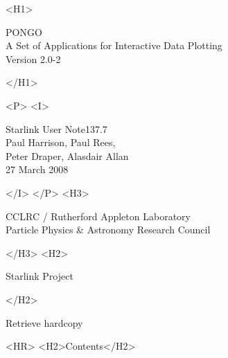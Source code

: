 \documentclass[twoside,11pt]{article}
\newcommand{\stardoccategory}  {Starlink User Note}
\newcommand{\stardocsource}    {sun137.7}
\newcommand{\stardocnumber}    {137.7}
\newcommand{\stardocauthors}   {Paul Harrison, Paul Rees, \\
                                Peter Draper, Alasdair Allan }
\newcommand{\stardocdate}      {27 March 2008}
\newcommand{\stardoctitle}     {PONGO\\[\latex{2ex}]
   A Set of Applications for Interactive Data Plotting \\[\latex{2ex}]
   Version 2.0-2}
\newcommand{\htmladdnormallink}[2]{#1}
\newcommand{\htmladdimg}[1]{}
\newcommand{\htmlref}[2]{#1}
\newcommand{\htmladdtonavigation}[1]{}
\newcommand{\latex}[1]{#1}
\newcommand{\xlabel}[1]{}
\renewcommand{\_}{\texttt{\symbol{95}}}
\newcommand{\latexonlytoc}[0]{\tableofcontents}
\begin{document}
\begin{htmlonly}
   \xlabel{}
   \begin{rawhtml} <H1> \end{rawhtml}
      \stardoctitle
   \begin{rawhtml} </H1> \end{rawhtml}


   \htmladdimg{main.gif}


   \begin{rawhtml} <P> <I> \end{rawhtml}
   \stardoccategory \stardocnumber \\
   \stardocauthors \\
   \stardocdate
   \begin{rawhtml} </I> </P> <H3> \end{rawhtml}
      \htmladdnormallink{CCLRC}{http://www.cclrc.ac.uk} /
      \htmladdnormallink{Rutherford Appleton Laboratory}
                        {http://www.cclrc.ac.uk/ral} \\
      \htmladdnormallink{Particle Physics \& Astronomy Research Council}
                        {http://www.pparc.ac.uk} \\
   \begin{rawhtml} </H3> <H2> \end{rawhtml}
      \htmladdnormallink{Starlink Project}{http://www.starlink.ac.uk/}
   \begin{rawhtml} </H2> \end{rawhtml}
   \htmladdnormallink{\htmladdimg{source.gif} Retrieve hardcopy}
      {http://www.starlink.ac.uk/cgi-bin/hcserver?\stardocsource}\\

  \label{stardoccontents}
  \begin{rawhtml}
    <HR>
    <H2>Contents</H2>
  \end{rawhtml}
  \renewcommand{\latexonlytoc}[0]{}
  \htmladdtonavigation{\htmlref{\htmladdimg{contents_motif.gif}}
        {stardoccontents}}

\end{htmlonly}
\end{document}

